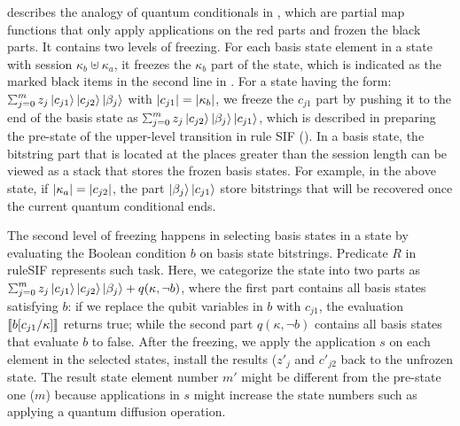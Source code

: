 \label{sec:conditionals}
 describes the analogy of quantum conditionals in \qafny, which are partial map functions that only apply applications on the red parts and frozen the black parts.
It contains two levels of freezing. For each basis state element in a state with session $\kappa_b\uplus \kappa_a$, it freezes the $\kappa_b$ part of the state, which is indicated as the marked black items in the second line in . For a state having the form: $\scha{m}{z_j}{c_{j1}}{\ket{c_{j2}}\ket{\beta_j}}$ with $|c_{j1}| = |\kappa_b|$, we freeze the $c_{j1}$ part by pushing it to the end of the basis state as $\scha{m}{z_j}{c_{j2}}{\ket{\beta_j}\ket{c_{j1}}}$, which is described in preparing the pre-state of the upper-level transition in rule \textsc{SIF} ().
In a basis state, the bitstring part that is located at the places greater than the session length can be viewed as a stack that stores the frozen basis states. For example, in the above state, 
if $|\kappa_a|=|c_{j2}|$, the part $\left\vert{\beta_j}\right\rangle\left\vert{c_{j1}}\right\rangle$ store bitstrings that will be recovered once the current quantum conditional ends.

The second level of freezing happens in selecting basis states in a state by evaluating the Boolean condition $b$ on basis state bitstrings. Predicate $R$ in rule\textsc{SIF} represents such task.
Here, we categorize the state into two parts as $\scha{m}{z_j}{c_{j1}}{\ket{c_{j2}}\ket{\beta_j}}+q(\kappa,\neg b)$, where the first part contains all basis states satisfying $b$: if we replace the qubit variables in $b$ with $c_{j1}$, the evaluation $\llbracket b[c_{j1}/\kappa] \rrbracket$ returns true; while the second part $q(\kappa,\neg b)$ contains all basis states that evaluate $b$ to false.
After the freezing, we apply the application $s$ on each element in the selected states, install the results ($z'_j$ and $c'_{j2}$ back to the unfrozen state.
The result state element number $m'$ might be different from the pre-state one ($m$) because applications in $s$ might increase the state numbers such as applying a quantum diffusion operation.

